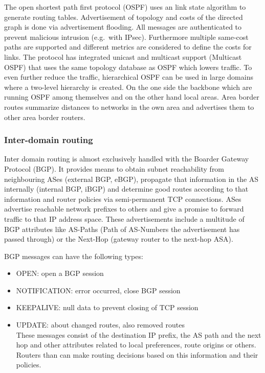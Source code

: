 The open shortest path first protocol (OSPF) uses an link state algorithm to generate routing tables.
Advertisement of topology and costs of the directed graph is done via advertisement flooding.
All messages are authenticated to prevent malicious intrusion (e.g.\ with IPsec).
Furthermore multiple same-cost paths are supported and different metrics are considered to define the costs for links.
The protocol has integrated unicast and multicast support (Multicast OSPF) that uses the same topology database as OSPF which lowers traffic.
To even further reduce the traffic, hierarchical OSPF can be used in large domains where a two-level hierarchy is created.
On the one side the backbone which are running OSPF among themselves and on the other hand local areas.
Area border routes summarize distances to networks in the own area and advertises them to other area border routers.

\subsubsection*{Inter-domain routing}
Inter domain routing is almost exclusively handled with the Boarder Gateway Protocol (BGP).
It provides means to obtain subnet reachability from neighbouring ASes (external BGP, eBGP), propagate that information in the AS internally (internal BGP, iBGP) and determine good routes according to that information and router policies via semi-permanent TCP connections.
ASes advertise reachable network prefixes to others and give a promise to forward traffic to that IP address space.
These advertisements include a multitude of BGP attributes like AS-Paths (Path of AS-Numbers the advertisement has passed through) or the Next-Hop (gateway router to the next-hop ASA).

BGP messages can have the following types:
\begin{itemize}
  \item OPEN: open a BGP session
  \item NOTIFICATION: error occurred, close BGP session
  \item KEEPALIVE: null data to prevent closing of TCP session
  \item UPDATE: about changed routes, also removed routes\\
    These messages consist of the destination IP prefix, the AS path and the next hop and other attributes related to local preferences, route origins or others.
    Routers than can make routing decisions based on this information and their policies.
\end{itemize}
